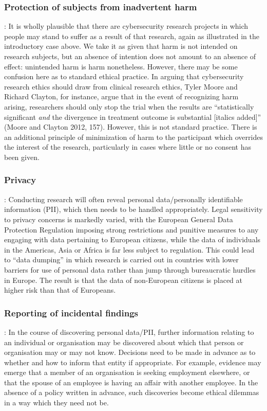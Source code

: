 \documentclass{svjour3}                     %
\begin{document}
\subsubsection{Protection of subjects from inadvertent harm}:
It is wholly plausible that there are cybersecurity research projects in which people may stand to suffer as a result of that research, again as illustrated in the introductory case above. We take it as given that harm is not intended on research subjects, but an absence of intention does not amount to an absence of effect: unintended harm is harm nonetheless. However, there may be some confusion here as to standard ethical practice. In arguing that cybersecurity research ethics should draw from clinical research ethics, Tyler Moore and Richard Clayton, for instance, argue that in the event of recognizing harm arising, researchers should only stop the trial when the results are “statistically significant \emph{and} the divergence in treatment outcome is substantial [italics added]” (Moore and Clayton 2012, 157). However, this is not standard practice. There is an additional principle of minimization of harm to the participant which overrides the interest of the research, particularly in cases where little or no consent has been given.

\subsubsection{Privacy}:
Conducting research will often reveal personal data/personally identifiable information (PII), which then needs to be handled appropriately. Legal sensitivity to privacy concerns is markedly varied, with the European General Data Protection Regulation imposing strong restrictions and punitive measures to any engaging with data pertaining to European citizens, while the data of individuals in the Americas, Asia or Africa is far less subject to regulation. This could lead to “data dumping” in which research is carried out in countries with lower barriers for use of personal data rather than jump through bureaucratic hurdles in Europe.  The result is that the data of non-European citizens is placed at higher risk than that of Europeans.

\subsubsection{Reporting of incidental findings}:
In the course of discovering personal data/PII, further information relating to an individual or organisation may be discovered about which that person or organisation may or may not know.  Decisions need to be made in advance as to whether and how to inform that entity if appropriate. For example, evidence may emerge that a member of an organisation is seeking employment elsewhere, or that the spouse of an employee is having an affair with another employee. In the absence of a policy written in advance, such discoveries become ethical dilemmas in a way which they need not be.
\end{document}
